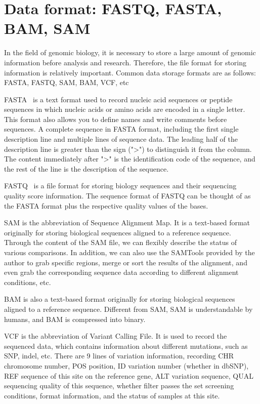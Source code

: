 \documentclass{PHlab-thesis}
\begin{document}
\section{Data format: FASTQ, FASTA, BAM, SAM}
In the field of genomic biology, it is necessary to store a large amount of genomic information before analysis and research. Therefore, the file format for storing information is relatively important. Common data storage formats are as follows: FASTA, FASTQ, SAM, BAM, VCF, etc
\par FASTA~\cite{pearson1988improved} is a text format used to record nucleic acid sequences or peptide sequences in which nucleic acids or amino acids are encoded in a single letter. This format also allows you to define names and write comments before sequences. A complete sequence in FASTA format, including the first single description line and multiple lines of sequence data. The leading half of the description line is greater than the sign (">") to distinguish it from the column. The content immediately after ">" is the identification code of the sequence, and the rest of the line is the description of the sequence.
\par FASTQ~\cite{cock2010sanger} is a file format for storing biology sequences and their sequencing quality score information. The sequence format of FASTQ can be thought of as the FASTA format plus the respective quality values of the bases.
\par SAM is the abbreviation of Sequence Alignment Map. It is a text-based format originally for storing biological sequences aligned to a reference sequence. Through the content of the SAM file, we can flexibly describe the status of various comparisons. In addition, we can also use the SAMTools provided by the author to grab specific regions, merge or sort the results of the alignment, and even grab the corresponding sequence data according to different alignment conditions, etc.
\par BAM is also a text-based format originally for storing biological sequences aligned to a reference sequence. Different from SAM, SAM is understandable by humans, and BAM is compressed into binary.
\par VCF is the abbreviation of Variant Calling File. It is used to record the sequenced data, which contains information about different mutations, such as SNP, indel, etc. There are 9 lines of variation information, recording CHR chromosome number, POS position, ID variation number (whether in dbSNP), REF sequence of this site on the reference gene, ALT variation sequence, QUAL sequencing quality of this sequence, whether filter passes the set screening conditions, format information, and the status of samples at this site.
\end{document}
